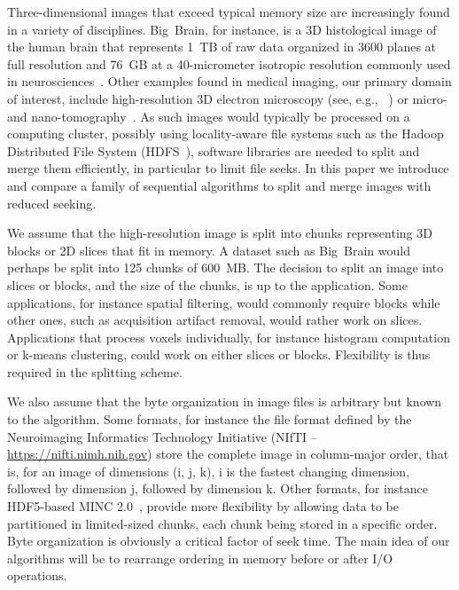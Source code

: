 \documentclass[10pt, conference, compsocconf]{IEEEtran}
\begin{document}
Three-dimensional images that exceed typical memory size are
increasingly found in a variety of disciplines. Big~Brain, for
instance, is a 3D histological image of the human brain that
represents 1~TB of raw data organized in 3600 planes at full
resolution and 76~GB at a 40-micrometer isotropic resolution commonly
used in neurosciences~\cite{amunts2013bigbrain}. Other examples found
in medical imaging, our primary domain of interest, include
high-resolution 3D electron microscopy (see, e.g.,
~\cite{bock2011network}) or micro- and
nano-tomography~\cite{10.1371/journal.pone.0035691}. As such images
would typically be processed on a computing cluster, possibly using
locality-aware file systems such as the Hadoop Distributed File System
(HDFS~\cite{shvachko2010hadoop}), software libraries are needed to
split and merge them efficiently, in particular to limit file
seeks. In this paper we introduce and compare a family of sequential
algorithms to split and merge images with reduced seeking.

We assume that the high-resolution image is split into chunks
representing 3D blocks or 2D slices that fit in memory. A dataset such
as Big~Brain would perhaps be split into 125 chunks of 600~MB. The
decision to split an image into slices or blocks, and the size of the
chunks, is up to the application. Some applications, for instance spatial filtering, would
commonly require blocks while other
ones, such as acquisition artifact removal, would rather work on
slices. Applications that process voxels individually, for instance
histogram computation or k-means clustering, could work on either
slices or blocks. Flexibility is thus required in the splitting
scheme.

We also assume that the byte organization in image files is arbitrary
but known to the algorithm. Some formats, for instance the file format
defined by the Neuroimaging Informatics Technology Initiative (NIfTI
-- \url{https://nifti.nimh.nih.gov}) store the complete image in
column-major order, that is, for an image of dimensions (i, j, k), i
is the fastest changing dimension, followed by dimension j, followed
by dimension k. Other formats, for instance HDF5-based MINC
2.0~\cite{vincent2016minc}, provide more flexibility by allowing data
to be partitioned in limited-sized chunks, each chunk being stored in
a specific order. Byte organization is obviously a critical factor of
seek time. The main idea of our algorithms will be to rearrange
ordering in memory before or after I/O operations.
\end{document}
